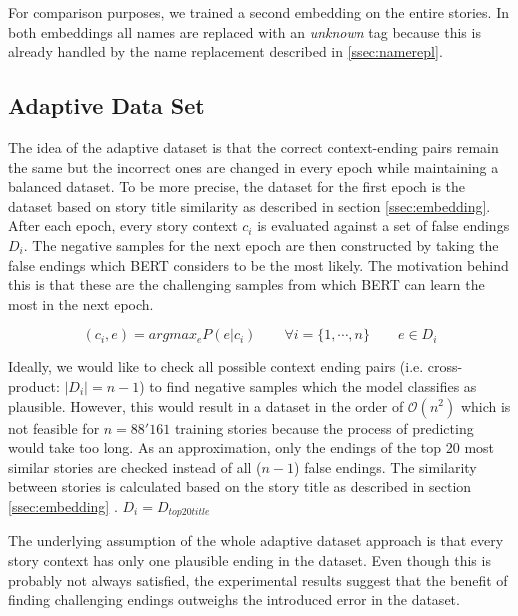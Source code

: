 \documentclass{article}
\begin{document}
For comparison purposes, we trained a second embedding on the entire stories.
In both embeddings all names are replaced with an \textit{unknown} tag because this is already handled by the name replacement described in \ref{ssec:namerepl}.

\subsection{Adaptive Data Set}\label{ssec:adaptive_dataset}
The idea of the adaptive dataset is that the correct context-ending pairs remain the same but the incorrect ones are changed in every epoch while maintaining a balanced dataset.
To be more precise, the dataset for the first epoch is the dataset based on story title similarity as described in section \ref{ssec:embedding}.
After each epoch, every story context $c_{i}$ is evaluated against a set of false endings $D_{i}$.
The negative samples for the next epoch are then constructed by taking the false endings which BERT considers to be the most likely.
The motivation behind this is that these are the challenging samples from which BERT can learn the most in the next epoch.

\begin{equation}
(c_i, e) = {argmax_e} {P(e|c_i)} \qquad \forall i =\{1, \cdots , n\} \qquad  e \in D_i
\end{equation}

Ideally, we would like to check all possible context ending pairs (i.e. cross-product: $|D_i| = n-1$) to find negative samples which the model classifies as plausible.
However, this would result in a dataset in the order of $\mathcal{O}(n^2)$ which is not feasible for $n=88'161$ training stories because the process of predicting would take too long.
As an approximation, only the endings of the top 20 most similar stories are checked instead of all ($n-1$) false endings. 
The similarity between stories is calculated based on the story title as described in section \ref{ssec:embedding} . $D_i = D_{top 20 title}$

The underlying assumption of the whole adaptive dataset approach is that every story context has only one plausible ending in the dataset.
Even though this is probably not always satisfied, the experimental results suggest that the benefit of finding challenging endings outweighs the introduced error in the dataset.
\end{document}
